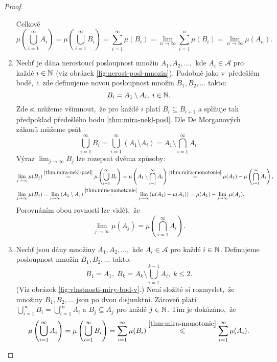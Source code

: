 \begin{proof}
\begin{enumerate}[label=\textit{(\roman*)}]
        Celkově
        \[\mu\left(\bigcup_{i=1}^\infty A_i\right)=\mu\left(\bigcup_{i=1}^\infty B_i\right)=\sum_{i=1}^{\infty}\mu(B_i)=\lim_{n\to\infty}\sum_{i=1}^{n}\mu(B_i)=\lim_{n\to\infty}\mu(A_n).\]
        \item Nechť je dána nerostoucí posloupnost množin $A_1,A_2,\ldots$,~kde $A_i\in\mathcal{A}$ pro každé $i\in\mathbb{N}$ (viz obrázek \ref{fig:nerost-posl-mnozin}). Podobně jako v~předešlém bodě,~i~zde definujeme novou posloupnost množin $B_1,B_2,\ldots$ takto:
        \[B_i=A_1\setminus A_i,\;i\in\mathbb{N}.\]
        Zde si můžeme všimnout,~že pro každé $i$ platí $B_i\subseteq B_{i+1}$ a splňuje tak předpoklad předešlého bodu \ref{thm:mira-nekl-posl}. Dle De Morganových zákonů můžeme psát
        \[\bigcup_{i=1}^\infty B_i=\bigcup_{i=1}^\infty(A_1\setminus A_i)=A_1\setminus\bigcap_{i=1}^\infty A_i.\]
        Výraz $\lim_{j\to\infty}B_j$ lze rozepsat dvěma způsoby:
        \begin{align*}
            \lim\limits_{j\to\infty}\mu(B_j)&\stackrel{\ref{thm:mira-nekl-posl}}{=}\mu\left(\bigcup\limits_{i=1}^\infty B_i\right)=\mu\left(A_1\setminus\bigcap\limits_{i=1}^\infty A_i\right)\stackrel{\ref{thm:mira-monotonie}}{=}\mu(A_1)-\mu\left(\bigcap\limits_{i=1}^\infty A_i\right),\\
            \lim\limits_{j\to\infty}\mu(B_j)&=\lim_{j\to\infty}(A_1\setminus A_j)\stackrel{\ref{thm:mira-monotonie}}{=}\lim_{j\to\infty}(\mu(A_1)-\mu(A_j))=\mu(A_1)-\lim_{j\to\infty}\mu(A_j).
        \end{align*}
        Porovnáním obou rovností lze vidět,~že
        \[\lim_{j\to\infty}\mu(A_j)=\mu\left(\bigcap\limits_{i=1}^\infty A_i\right).\]
        \item Nechť jsou dány množiny $A_1,A_2,\ldots$,~kde $A_i\in\mathcal{A}$ pro každé $i\in\mathbb{N}$. Definujeme posloupnost množin $B_1,B_2,\ldots$ takto:
        \[B_1=A_1,\;B_k=A_k\setminus\bigcup_{i=1}^{k-1} A_i,\;k\leqslant 2.\]
        (Viz obrázek \ref{fig:vlastnosti-miry-bod-v}.) Není složité si rozmyslet,~že množiny $B_1,B_2,\ldots$ jsou po dvou disjunktní. Zároveň platí $\bigcup_{i=1}^\infty B_i=\bigcup_{i=1}^\infty A_i$ a $B_j\subseteq A_j$ pro každé $j\in\mathbb{N}$. Tím je dokázáno,~že
        \[\mu\left(\bigcup_{i=1}^\infty A_i\right)=\mu\left(\bigcup_{i=1}^\infty B_i\right)=\sum_{i=1}^{\infty}\mu(B_i)\stackrel{\ref{thm:mira-monotonie}}{\leqslant}\sum_{i=1}^{\infty}\mu(A_i).\]
    \end{enumerate}
    \begin{figure}[h]
        \centering
        \begin{subfigure}{0.45\textwidth}

\end{subfigure}
\end{figure}
\end{proof}
